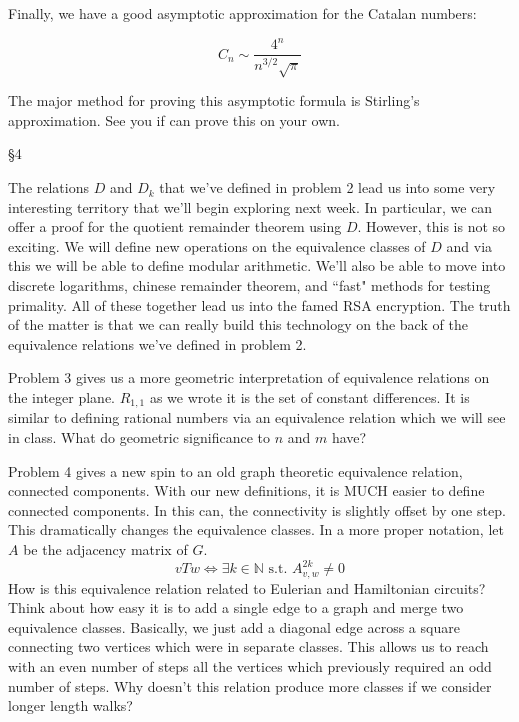 \documentclass[16 pt]{amsart}
\theoremstyle{definition}
\theoremstyle{remark}
\numberwithin{equation}{subsection}
\begin{document}
Finally, we have a good asymptotic approximation for the Catalan numbers:

\[
C_n \sim \frac{4^n}{n^{3/2}\sqrt{\pi}}
\]

The major method for proving this asymptotic formula is Stirling's approximation.  See you if can prove this on your own.


\S4

The relations $D$ and $D_k$ that we've defined in problem 2 lead us into some very interesting territory that we'll begin exploring next week.  In particular, we can offer a proof for the quotient remainder theorem using $D$.  However, this is not so exciting.  We will define new operations on the equivalence classes of $D$ and via this we will be able to define modular arithmetic.  We'll also be able to move into discrete logarithms, chinese remainder theorem, and ``fast" methods for testing primality.  All of these together lead us into the famed RSA encryption.  The truth of the matter is that we can really build this technology on the back of the equivalence relations we've defined in problem 2.

\par Problem 3 gives us a more geometric interpretation of equivalence relations on the integer plane.  $R_{1,1}$ as we wrote it is the set of constant differences.  It is similar to defining rational numbers via an equivalence relation which we will see in class.  What do geometric significance to $n$ and $m$ have?

\par Problem 4 gives a new spin to an old graph theoretic equivalence relation, connected components.  With our new definitions, it is MUCH easier to define connected components.  In this can, the connectivity is slightly offset by one step.  This dramatically changes the equivalence classes.  In a more proper notation, let $A$ be the adjacency matrix of $G$.
\[
vTw \iff \exists k\in\mathbb{N} \text{ s.t. } A^{2k}_{v,w}\ne 0
\]
How is this equivalence relation related to Eulerian and Hamiltonian circuits?  Think about how easy it is to add a single edge to a graph and merge two equivalence classes.  Basically, we just add a diagonal edge across a square connecting two vertices which were in separate classes.  This allows us to reach with an even number of steps all the vertices which previously required an odd number of steps.  Why doesn't this relation produce more classes if we consider longer length walks?
\end{document}
